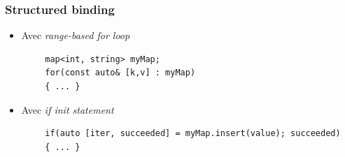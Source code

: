 \documentclass[C++.tex]{subfiles}
\begin{document}
\begin{frame}[fragile]
	\frametitle{Structured binding}
	\begin{itemize}
		\item Avec \textit{range-based for loop}
	\end{itemize}

	\begin{verbatim}
		map<int, string> myMap;    
		for(const auto& [k,v] : myMap)
		{ ... }
	\end{verbatim}

	\begin{itemize}
		\item Avec \textit{if init statement}
	\end{itemize}

	\begin{verbatim}
		if(auto [iter, succeeded] = myMap.insert(value); succeeded)
		{ ... }
	\end{verbatim}


\end{frame}
\end{document}
